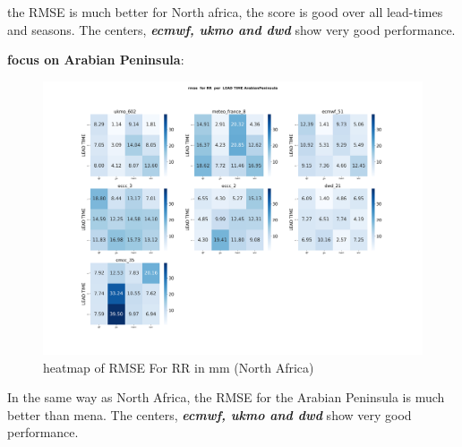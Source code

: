 the RMSE is much better for North africa, the score is good over all lead-times and seasons. The centers, \textbf{\textit{ecmwf, ukmo and dwd}} show very good performance.

\vspace{1.5cm}
\textbf{focus on Arabian Peninsula}:

\begin{figure}[H]
\centering
\includegraphics[scale=0.3]{plots/det/rmse/rmse_RR_ArabianPeninsula.png}
\caption{heatmap of RMSE For RR in mm (North Africa)}
\end{figure}

In the same way as North Africa, the RMSE for the Arabian Peninsula is much better than mena. The centers, \textbf{\textit{ecmwf, ukmo and dwd}} show very good performance.


